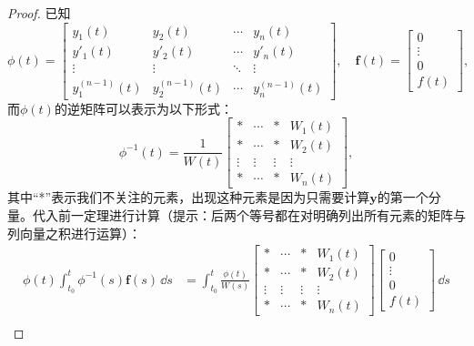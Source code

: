 \begin{proof}
    已知
    \begin{equation}
        \phi(t)=\begin{bmatrix}
        y_1(t) & y_2(t) & \cdots & y_n(t)\\
        y'_1(t) & y'_2(t) & \cdots & y'_n(t)\\
        \vdots & \vdots & \ddots & \vdots\\
        y_1^{(n-1)}(t) & y_2^{(n-1)}(t) & \cdots & y_n^{(n-1)}(t)
        \end{bmatrix},\quad\mathbf{f}(t)=\begin{bmatrix}
        0\\
        \vdots\\
        0\\
        f(t)
        \end{bmatrix},
    \end{equation}
    而$\phi(t)$的逆矩阵可以表示为以下形式：
    \begin{equation}
        \phi^{-1}(t)=\frac{1}{W(t)}\begin{bmatrix}
        * & \cdots & * & W_1(t)\\
        * &  \cdots & * & W_2(t)\\
        \vdots & \vdots & \vdots & \vdots\\
        * &  \cdots & * & W_n(t)
        \end{bmatrix},
    \end{equation}
    其中“*”表示我们不关注的元素，出现这种元素是因为只需要计算$\mathbf{y}$的第一个分量。代入前一定理进行计算（提示：后两个等号都在对明确列出所有元素的矩阵与列向量之积进行运算）：
    \begin{align}
        \phi(t)\int_{t_0}^t \phi^{-1}(s)\mathbf{f}(s)\,\dd s
        &=\int_{t_0}^t \frac{\phi(t)}{W(s)}\begin{bmatrix}
        * & \cdots & * & W_1(t)\\
        * &  \cdots & * & W_2(t)\\
        \vdots & \vdots & \vdots & \vdots\\
        * &  \cdots & * & W_n(t)
        \end{bmatrix}\begin{bmatrix}
        0\\
        \vdots\\
        0\\
        f(t)
        \end{bmatrix}\,\dd s\nonumber\\

\end{align}
\end{proof}
